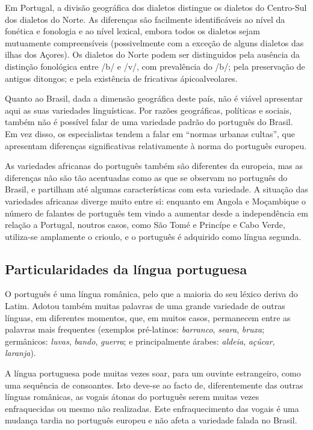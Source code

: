 \documentclass[]{../metanetpaper}
\begin{document}
\begin{multicols}{2}
Em Portugal, a divisão geográfica dos dialetos\cite{cintra} distingue os dialetos do Centro-Sul dos dialetos do Norte. As diferenças são facilmente identificáveis ao nível da fonética e fonologia e ao nível lexical, embora todos os dialetos sejam mutuamente compreensíveis (possivelmente com a exceção de alguns dialetos das ilhas dos Açores). Os dialetos do Norte podem ser distinguidos pela ausência da distinção fonológica entre /b/ e /v/, com prevalência do /b/; pela preservação de antigos ditongos; e pela existência de fricativas ápicoalveolares. 

Quanto ao Brasil, dada a dimensão geográfica deste país, não é viável apresentar aqui as suas variedades linguísticas. Por razões geográficas, políticas e sociais, também não é possível falar de uma variedade padrão do português do Brasil. Em vez disso, os especialistas tendem a falar em “normas urbanas cultas”, que apresentam diferenças significativas relativamente à norma do português europeu. 

As variedades africanas do português também são diferentes da europeia, mas as diferenças não são tão acentuadas como as que se observam no português do Brasil, e partilham até algumas características com esta variedade. A situação das variedades africanas diverge muito entre si: enquanto em Angola e Moçambique o número de falantes de português tem vindo a aumentar desde a independência em relação a Portugal, noutros casos, como São Tomé e Princípe e Cabo Verde, utiliza-se amplamente o crioulo, e o português é adquirido como língua segunda.


\subsection{Particularidades da língua portuguesa}

O português é uma língua românica\cite{cardeira}, pelo que a maioria do seu léxico deriva do Latim. Adotou também muitas palavras de uma grande variedade de outras línguas, em diferentes momentos, que, em muitos casos, permanecem entre as palavras mais frequentes (exemplos pré-latinos: \textit{barranco}, \textit{seara}, \textit{bruxa}; germânicos: \textit{luvas}, \textit{bando}, \textit{guerra}; e principalmente árabes: \textit{aldeia}, \textit{açúcar}, \textit{laranja}).

A língua portuguesa pode muitas vezes soar, para um ouvinte estrangeiro, como uma sequência de consoantes. Isto deve-se ao facto de, diferentemente das outras línguas românicas, as vogais átonas do português serem muitas vezes enfraquecidas ou mesmo não realizadas. Este enfraquecimento das vogais é uma mudança tardia no português europeu e não afeta a variedade falada no Brasil.


\end{multicols}
\end{document}
